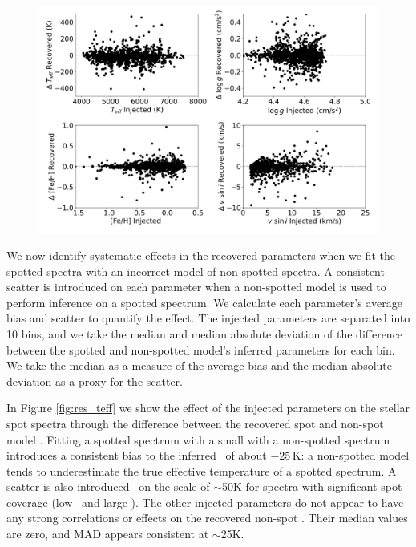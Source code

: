 \begin{figure}
    \includegraphics[width=\textwidth]{Figures/ss_chapter_figures/recov_tests_full.png}
    \caption{}
    \label{fig:recov_dif}
\end{figure}


We now identify systematic effects in the recovered parameters when we fit the spotted spectra with an incorrect model of non-spotted spectra.  A consistent scatter is introduced on each parameter when a non-spotted model is used to perform inference on a spotted spectrum. We calculate each parameter's average bias and scatter to quantify the effect. The injected parameters are separated into 10 bins, and we take the median and median absolute deviation of the difference between the spotted and non-spotted model's inferred parameters for each bin. We take the median as a measure of the average bias and the median absolute deviation as a proxy for the scatter.

In Figure \ref{fig:res_teff} we show the effect of the injected parameters on the stellar spot spectra through the difference between the recovered spot and non-spot model \teff. Fitting a spotted spectrum with a small \xspot with a non-spotted spectrum introduces a consistent bias to the inferred \teff\ of about $-25$\,K: a non-spotted model tends to underestimate the true effective temperature of a spotted spectrum. A scatter is also introduced \teff\ on the scale of $\sim$50K for spectra with significant spot coverage (low \xspot\ and large \fspot). The other injected parameters do not appear to have any strong correlations or effects on the recovered non-spot \teff. Their median values are zero, and MAD appears consistent at $\sim$25K.



